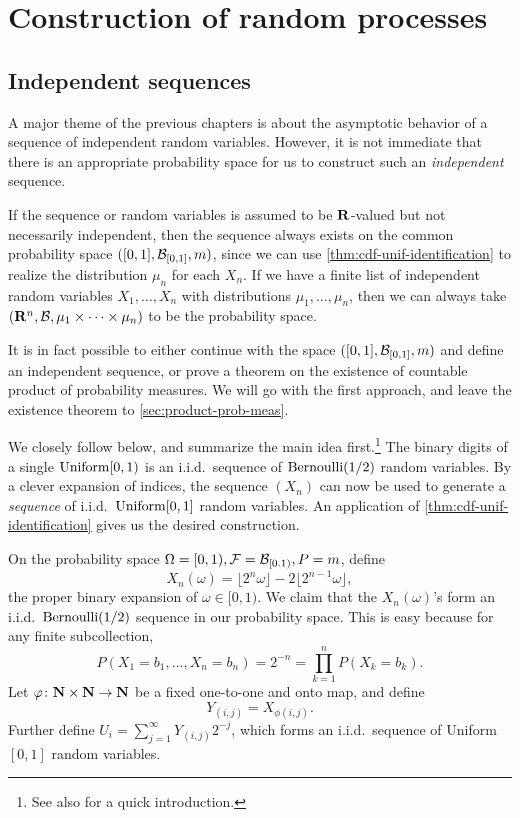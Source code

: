 \documentclass[10pt]{book}
\begin{document}
\chapter{Construction of random processes}

\section{Independent sequences} \label{sec:indep-seq}

A major theme of the previous chapters is about the asymptotic behavior of a sequence of independent random variables. However, it is not immediate that there is an appropriate probability space for us to construct such an \emph{independent} sequence.

If the sequence or random variables is assumed to be $\mathbf{R}$-valued but not necessarily independent, then the sequence always exists on the common probability space $([0,1],\mathcal{B}_{[0,1]},m)$, since we can use \cref{thm:cdf-unif-identification} to realize the distribution $\mu_n$ for each $X_n$. If we have a finite list of independent random variables $X_1,\dotsc,X_n$ with distributions $\mu_1,\dotsc,\mu_n$, then we can always take $(\mathbf{R}^n,\mathcal{B},\mu_1\times\dotsb\times \mu_n)$ to be the probability space.

It is in fact possible to either continue with the space $([0,1],\mathcal{B}_{[0,1]},m)$ and define an independent sequence, or prove a theorem on the existence of countable product of probability measures. We will go with the first approach, and leave the existence theorem to \cref{sec:product-prob-meas}.

We closely follow \cite{Le_Gall_2022} below, and summarize the main idea first.\footnote{See also \cite[Theorem~4.19]{Kallenberg_2021} for a quick introduction.} The binary digits of a single $\operatorname{Uniform}[0,1)$ is an i.i.d.\ sequence of $\operatorname{Bernoulli}(1/2)$ random variables. By a clever expansion of indices, the sequence $(X_n)$ can now be used to generate a \emph{sequence} of i.i.d.\ $\operatorname{Uniform}[0,1]$ random variables. An application of \cref{thm:cdf-unif-identification} gives us the desired construction.

On the probability space $\Omega=[0,1),\mathcal{F}=\mathcal{B}_{[0.1)}, P = m$, define \[X_n(\omega) = \lfloor 2^n \omega \rfloor - 2\lfloor 2^{n-1} \omega \rfloor,\] the proper binary expansion of $\omega \in [0,1)$. We claim that the $X_n (\omega)$'s form an i.i.d.\ $\operatorname{Bernoulli}(1/2)$ sequence in our probability space. This is easy because for any finite subcollection, \[
    P(X_1 = b_1, \dotsc,X_n = b_n) = 2^{-n} = \prod_{k=1}^n P(X_k = b_k).
\] Let $\varphi\colon \mathbf{N} \times \mathbf{N} \to \mathbf{N}$ be a fixed one-to-one and onto map, and define \[
    Y_{(i,j)} = X_{\phi(i,j)}.
\] Further define $U_i = \sum_{j=1}^\infty Y_{(i,j)} 2^{-j}$, which forms an i.i.d.\ sequence of Uniform$[0,1]$ random variables.
\end{document}

